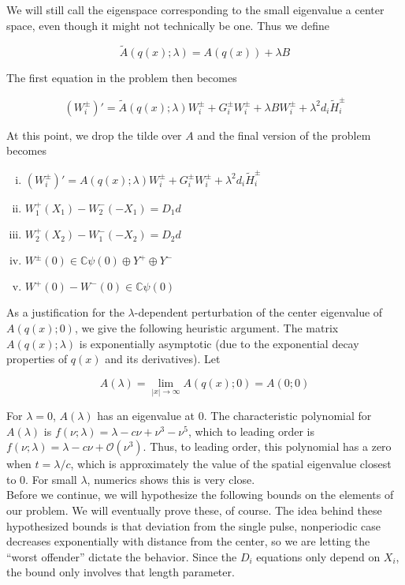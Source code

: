 \documentclass[12pt]{article}
\def\C{{\mathbb C}}
\begin{document}
We will still call the eigenspace corresponding to the small eigenvalue a center space, even though it might not technically be one. Thus we define

\[
\tilde{A}(q(x); \lambda) = A(q(x)) + \lambda B
\]

The first equation in the problem then becomes

\[
(W_i^\pm)' = \tilde{A}(q(x); \lambda) W_i^\pm + G_i^\pm W_i^\pm + \lambda B W_i^\pm + \lambda^2 d_i \tilde{H}_i^\pm
\]

At this point, we drop the tilde over $A$ and the final version of the problem becomes

\begin{enumerate}[(i)]
\item $(W_i^\pm)' = A(q(x); \lambda) W_i^\pm + G_i^\pm W_i^\pm + \lambda^2 d_i \tilde{H}_i^\pm$
\item $W_1^+(X_1) - W_2^-(-X_1) = D_1 d$
\item $W_2^+(X_2) - W_1^-(-X_2) = D_2 d$
\item $W^\pm(0) \in \C \psi(0) \oplus Y^+ \oplus Y^-$
\item $W^+(0) - W^-(0) \in \C \psi(0) $
\end{enumerate}

As a justification for the $\lambda$-dependent perturbation of the center eigenvalue of $A(q(x); 0)$, we give the following heuristic argument.
The matrix $A(q(x); \lambda)$ is exponentially asymptotic (due to the exponential decay properties of $q(x)$ and its derivatives). Let 

\[
A(\lambda) = \lim_{|x| \rightarrow \infty} A(q(x); 0) = A(0; 0)
\]

For $\lambda = 0$, $A(\lambda)$ has an eigenvalue at 0. The characteristic polynomial for $A(\lambda)$ is $f(\nu; \lambda) = \lambda - c \nu + \nu^3 - \nu^5$, which to leading order is $f(\nu; \lambda) = \lambda - c \nu + \mathcal{O}(\nu^3)$. Thus, to leading order, this polynomial has a zero when $t = \lambda / c$, which is approximately the value of the spatial eigenvalue closest to 0. For small $\lambda$, numerics shows this is very close.\\

Before we continue, we will hypothesize the following bounds on the elements of our problem. We will eventually prove these, of course. The idea behind these hypothesized bounds is that deviation from the single pulse, nonperiodic case decreases exponentially with distance from the center, so we are letting the ``worst offender'' dictate the behavior. Since the $D_i$ equations only depend on $X_i$, the bound only involves that length parameter.
\end{document}
